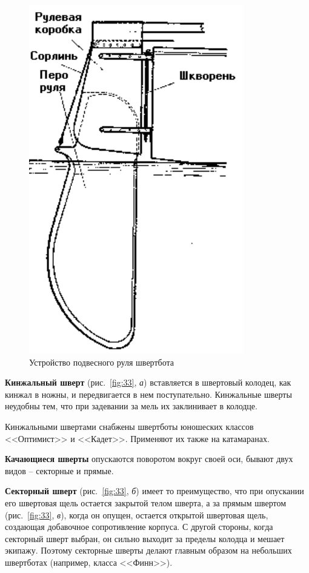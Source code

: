 \documentclass[a4paper, 12pt, twoside, final]{scrbook}
\begin{document}
\begin{figure}%
\begin{centering}
\includegraphics{pics/Rul_shvertbota}
\par\end{centering}

\protect\caption{\label{fig:32}Устройство подвесного руля швертбота}


\end{figure}

\textbf{Кинжальный шверт} (рис.~\ref{fig:33},
\emph{а}) вставляется в швертовый колодец, как кинжал в ножны, и передвигается
в нем поступательно. Кинжальные шверты неудобны тем, что при задевании
за мель их заклинивает в колодце.

Кинжальными швертами снабжены швертботы юношеских классов <<Оптимист>>
и <<Кадет>>. Применяют их также на катамаранах.

\textbf{Качающиеся шверты} опускаются поворотом вокруг своей оси,
бывают двух видов \--- секторные и прямые.

\textbf{Секторный шверт} (рис.~\ref{fig:33},
\emph{б}) имеет то преимущество, что при опускании его швертовая щель
остается закрытой телом шверта, а за прямым швертом (рис.~\ref{fig:33},
\emph{в}), когда он опущен, остается открытой швертовая щель, создающая
добавочное сопротивление корпуса. С другой стороны, когда секторный
шверт выбран, он сильно выходит за пределы колодца и мешает экипажу.
Поэтому секторные шверты делают главным образом на небольших швертботах
(например, класса <<Финн>>). 
\end{document}

